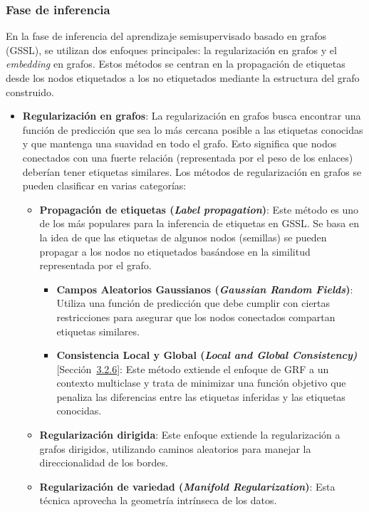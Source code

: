 \subsubsection{Fase de inferencia}
En la fase de inferencia del aprendizaje semisupervisado basado en grafos (GSSL), se utilizan dos enfoques principales: la regularización en grafos y el \textit{embedding} en grafos. Estos métodos se centran en la propagación de etiquetas desde los nodos etiquetados a los no etiquetados mediante la estructura del grafo construido.
\begin{itemize}
	\item \textbf{Regularización en grafos}: La regularización en grafos busca encontrar una función de predicción que sea lo más cercana posible a las etiquetas conocidas y que mantenga una suavidad en todo el grafo. Esto significa que nodos conectados con una fuerte relación (representada por el peso de los enlaces) deberían tener etiquetas similares. Los métodos de regularización en grafos se pueden clasificar en varias categorías:
	\begin{itemize}
		\item \textbf{Propagación de etiquetas (\textit{Label propagation})}: Este método es uno de los más populares para la inferencia de etiquetas en GSSL. Se basa en la idea de que las etiquetas de algunos nodos (semillas) se pueden propagar a los nodos no etiquetados basándose en la similitud representada por el grafo.
		\begin{itemize}
			\item \textbf{Campos Aleatorios Gaussianos (\textit{Gaussian Random Fields})}: Utiliza una función de predicción que debe cumplir con ciertas restricciones para asegurar que los nodos conectados compartan etiquetas similares.
			\item \textbf{Consistencia Local y Global (\textit{Local and Global Consistency)}} [Sección~\hyperref[sec3:LGC]{3.2.6}]: Este método extiende el enfoque de GRF a un contexto multiclase y trata de minimizar una función objetivo que penaliza las diferencias entre las etiquetas inferidas y las etiquetas conocidas.
		\end{itemize}
		\item \textbf{Regularización dirigida}: Este enfoque extiende la regularización a grafos dirigidos, utilizando caminos aleatorios para manejar la direccionalidad de los bordes.
		\item \textbf{Regularización de variedad (\textit{Manifold Regularization})}:  Esta técnica aprovecha la geometría intrínseca de los datos.

\end{itemize}
\end{itemize}
